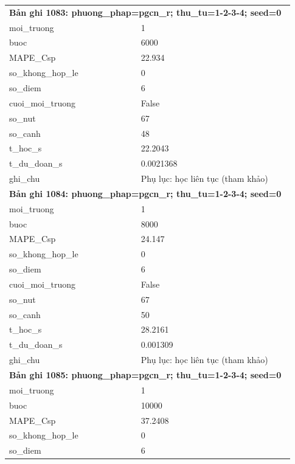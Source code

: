 \begin{longtable}{p{0.43\linewidth}p{0.50\linewidth}}
\midrule
\multicolumn{2}{p{0.95\linewidth}}{\textbf{Bản ghi 1083: phuong\_phap=pgcn\_r; thu\_tu=1-2-3-4; seed=0}} \\
moi\_\allowbreak truong & 1 \\
buoc & 6000 \\
MAPE\_\allowbreak Csp & 22.934 \\
so\_\allowbreak khong\_\allowbreak hop\_\allowbreak le & 0 \\
so\_\allowbreak diem & 6 \\
cuoi\_\allowbreak moi\_\allowbreak truong & False \\
so\_\allowbreak nut & 67 \\
so\_\allowbreak canh & 48 \\
t\_\allowbreak hoc\_\allowbreak s & 22.2043 \\
t\_\allowbreak du\_\allowbreak doan\_\allowbreak s & 0.0021368 \\
ghi\_\allowbreak chu & Phụ lục: học liên tục (tham khảo) \\
\midrule
\multicolumn{2}{p{0.95\linewidth}}{\textbf{Bản ghi 1084: phuong\_phap=pgcn\_r; thu\_tu=1-2-3-4; seed=0}} \\
moi\_\allowbreak truong & 1 \\
buoc & 8000 \\
MAPE\_\allowbreak Csp & 24.147 \\
so\_\allowbreak khong\_\allowbreak hop\_\allowbreak le & 0 \\
so\_\allowbreak diem & 6 \\
cuoi\_\allowbreak moi\_\allowbreak truong & False \\
so\_\allowbreak nut & 67 \\
so\_\allowbreak canh & 50 \\
t\_\allowbreak hoc\_\allowbreak s & 28.2161 \\
t\_\allowbreak du\_\allowbreak doan\_\allowbreak s & 0.001309 \\
ghi\_\allowbreak chu & Phụ lục: học liên tục (tham khảo) \\
\midrule
\multicolumn{2}{p{0.95\linewidth}}{\textbf{Bản ghi 1085: phuong\_phap=pgcn\_r; thu\_tu=1-2-3-4; seed=0}} \\
moi\_\allowbreak truong & 1 \\
buoc & 10000 \\
MAPE\_\allowbreak Csp & 37.2408 \\
so\_\allowbreak khong\_\allowbreak hop\_\allowbreak le & 0 \\
so\_\allowbreak diem & 6 \\

\end{longtable}
